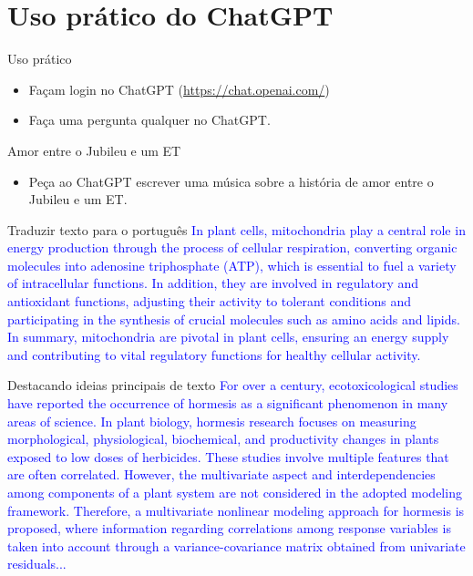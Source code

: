 \documentclass{beamer}
\begin{document}
\section{Uso prático do ChatGPT}
\begin{frame}{Uso prático}
\begin{itemize}\itemsep=2cm
    \item Façam login no ChatGPT (\url{https://chat.openai.com/})
    \item Faça uma pergunta qualquer no ChatGPT.
\end{itemize}
\end{frame}

\begin{frame}{Amor entre o Jubileu e um ET}
\begin{itemize}\itemsep=2cm
    \item Peça ao ChatGPT escrever uma música sobre a história de amor entre o Jubileu e um ET.
\end{itemize}
\end{frame}

\begin{frame}{Traduzir texto para o português}
 \textcolor{blue}{In plant cells, mitochondria play a central role in energy production through the process of cellular respiration, converting organic molecules into adenosine triphosphate (ATP), which is essential to fuel a variety of intracellular functions. In addition, they are involved in regulatory and antioxidant functions, adjusting their activity to tolerant conditions and participating in the synthesis of crucial molecules such as amino acids and lipids. In summary, mitochondria are pivotal in plant cells, ensuring an energy supply and contributing to vital regulatory functions for healthy cellular activity.}
\end{frame}


\begin{frame}{Destacando ideias principais de texto}
 \textcolor{blue}{For over a century, ecotoxicological studies have reported the occurrence of hormesis as a significant phenomenon in many areas of science. In plant biology, hormesis research focuses on measuring morphological, physiological, biochemical, and productivity changes in plants exposed to low doses of herbicides. These studies involve multiple features that are often correlated. However, the multivariate aspect and interdependencies among components of a plant system are not considered in the adopted modeling framework. Therefore, a multivariate nonlinear modeling approach for hormesis is proposed, where information regarding correlations among response variables is taken into account through a variance-covariance matrix obtained from univariate residuals...}
\end{frame}
\end{document}
